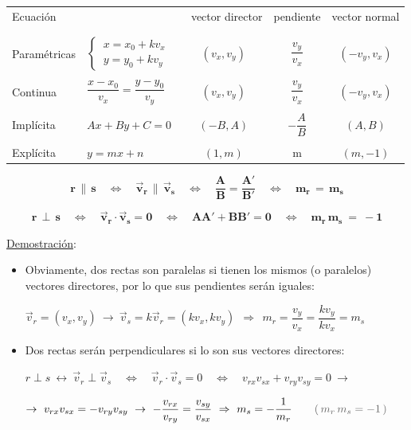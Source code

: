 \begin{table}[H]
\centering
\begin{tabular}{ll|ccc}
Ecuación &  & $\ $ vector director & pendiente & vector normal \\ &&&& \\ \hline &&&& \\
Paramétricas & $\begin{cases} \, x=x_0+kv_x \\ \, y=y_0+kv_y \end{cases}$ & $(v_x,v_y)$  & $\dfrac {v_y}{v_x}$ & $(-v_y,v_x)$ \\ &&&& \\
Continua & $\dfrac{x-x_0}{v_x}=\dfrac{y-y_0}{v_y}$ & $(v_x,v_y)$  & $\dfrac {v_y}{v_x}$ & $(-v_y,v_x)$ \\ &&&& \\
Implícita & $Ax+By+C=0 \ $  & $(-B,A)$ & $-\dfrac A B$ & $(A,B)$ \\ &&&& \\
Explícita & $y=mx+n$ & $(1,m)$ & m & $(m,-1)$
\end{tabular}
\end{table}

\vspace{5mm}
\begin{theorem}

\begin{large}
$$ \boxed{ \ \boldsymbol{ r\, \parallel \, s \quad \Leftrightarrow \quad  \vec v_r\, \parallel \, \vec v_s \quad \Leftrightarrow \quad \dfrac{A}{B}=\dfrac{A'}{B'} \quad \Leftrightarrow \quad m_r\, = \, m_s } \ } $$	

$$ \boxed{ \ \boldsymbol{ r\, \perp \, s \quad \Leftrightarrow \quad  \vec v_r \cdot  \vec v_s=0 \quad \Leftrightarrow \quad AA'+BB'=0 \quad \Leftrightarrow \quad  m_r\, m_s \ = \ -1} \ } $$	
\end{large}
\end{theorem}

\underline{Demostración}:

\begin{itemize}
\item Obviamente, dos rectas son paralelas si tienen los mismos (o paralelos) vectores directores, por lo que sus pendientes serán iguales: 

$ \vec v_r=(v_x,v_y) \ \to \ \vec v_s=k\vec v_r=(kv_x,kv_y) \ \ \Rightarrow \ \ m_r=\dfrac{v_y}{v_x}=\dfrac{kv_y}{kv_x}=m_s$
\item Dos rectas serán perpendiculares si lo son sus vectores directores:

$r\perp s \ \leftrightarrow \ \vec v_r \perp \vec v_s \quad \Leftrightarrow \quad \vec v_r\cdot \vec v_s= 0 \quad \Leftrightarrow \quad v_{rx}v_{sx}+v_{ry}v_{sy}=0 \ \to $

$\to \ v_{rx}v_{sx}=-v_{ry}v_{sy} \ \to \ -\dfrac{v_{rx}}{v_{ry}}=\dfrac{v_{sy}}{v_{sx}} \ \Rightarrow \ m_s=-\dfrac{1}{m_r} \qquad \textcolor{gris}{(\, m_r\, m_s=-1 \, ) }$ \QED
  \end{itemize}


